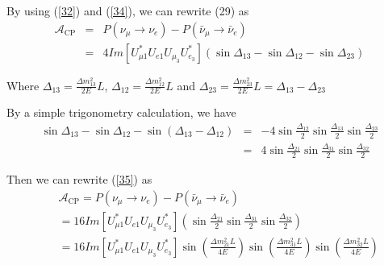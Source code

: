 \documentclass[a4 paper,12pt]{report}%
\begin{document}
By using (\ref{32}) and (\ref{34}), we can rewrite (29) as
   \begin{eqnarray}\label{35} 
\mathcal{A}_{\text{CP}} &=&P(\nu_\mu \rightarrow \nu_e)-P(\bar\nu_\mu \rightarrow \bar\nu_e) \nonumber\\
&=& 4Im\left[U^*_{\mu 1}U_{e 1}U_{\mu_3}U^*_{e_3}\right] \left( \sin\Delta_{13} - \sin\Delta_{12} - \sin\Delta_{23}\right)
  \end{eqnarray} \par
Where $\Delta_{13} = \frac{\Delta m^2_{13}}{2E}L$, $ \Delta_{12}=\frac{\Delta m^2_{12}}{2E}L$ and $ \Delta_{23} =\frac{\Delta m^2_{23}}{2E}L = \Delta_{13} - \Delta_{23}$ \par
By a simple trigonometry calculation, we have
   \begin{eqnarray}\label{36} 
\sin\Delta_{13} - \sin\Delta_{12} - \sin(\Delta_{13} - \Delta_{12}) &=& - 4 \sin\frac{\Delta_{12}}{2}\sin\frac{\Delta_{13}}{2}\sin\frac{\Delta_{23}}{2}\nonumber \\
&=& 4 \sin\frac{\Delta_{21}}{2}\sin\frac{\Delta_{31}}{2}\sin\frac{\Delta_{32}}{2}\nonumber 
  \end{eqnarray} \par
Then we can rewrite (\ref{35}) as
   \begin{eqnarray}\label{37} 
&&\mathcal{A}_{\text{CP}} =P(\nu_\mu \rightarrow \nu_e)-P(\bar\nu_\mu \rightarrow \bar\nu_e) \nonumber\\
&& = 16Im\left[U^*_{\mu 1}U_{e 1}U_{\mu_3}U^*_{e_3}\right] \left(  \sin\frac{\Delta_{21}}{2}\sin\frac{\Delta_{31}}{2}\sin\frac{\Delta_{32}}{2}\right)\nonumber \\
&& = 16Im\left[U^*_{\mu 1}U_{e 1}U_{\mu_3}U^*_{e_3}\right]   \sin\left(\frac{\Delta m^2_{21}L}{4E}\right)\sin\left(\frac{\Delta m^2_{31}L}{4E}\right)\sin\left(\frac{\Delta m^2_{32}L}{4E}\right)
  \end{eqnarray} \par
\end{document}
